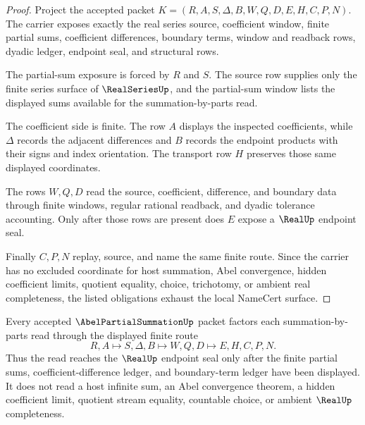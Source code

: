 \begin{proof}
Project the accepted packet $K=(R,A,S,\Delta,B,W,Q,D,E,H,C,P,N)$. The carrier exposes exactly the real series source, coefficient window, finite partial sums, coefficient differences, boundary terms, window and readback rows, dyadic ledger, endpoint seal, and structural rows.

The partial-sum exposure is forced by $R$ and $S$. The source row supplies only the finite series surface of $\RealSeriesUp$, and the partial-sum window lists the displayed sums available for the summation-by-parts read.

The coefficient side is finite. The row $A$ displays the inspected coefficients, while $\Delta$ records the adjacent differences and $B$ records the endpoint products with their signs and index orientation. The transport row $H$ preserves those same displayed coordinates.

The rows $W,Q,D$ read the source, coefficient, difference, and boundary data through finite windows, regular rational readback, and dyadic tolerance accounting. Only after those rows are present does $E$ expose a $\RealUp$ endpoint seal.

Finally $C,P,N$ replay, source, and name the same finite route. Since the carrier has no excluded coordinate for host summation, Abel convergence, hidden coefficient limits, quotient equality, choice, trichotomy, or ambient real completeness, the listed obligations exhaust the local NameCert surface.
\end{proof}

\begin{theorem}
\label{thm:abel-partial-summation-by-parts-route}
Every accepted $\AbelPartialSummationUp$ packet factors each summation-by-parts read through the displayed finite route
$$
R,A \longmapsto S,\Delta,B \longmapsto W,Q,D \longmapsto E,H,C,P,N .
$$
Thus the read reaches the $\RealUp$ endpoint seal only after the finite partial sums, coefficient-difference ledger, and boundary-term ledger have been displayed. It does not read a host infinite sum, an Abel convergence theorem, a hidden coefficient limit, quotient stream equality, countable choice, or ambient $\RealUp$ completeness.
\end{theorem}


